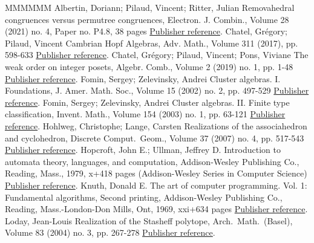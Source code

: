 \documentclass[11pt]{article}
\theoremstyle{definition}
\numberwithin{equation}{section}
\begin{document}
\begin{thebibliography}{MMMMMM}
 Albertin, Doriann; Pilaud, Vincent; Ritter, Julian Removahedral congruences versus permutree congruences, Electron. J. Combin., Volume 28 (2021) no. 4, Paper no. P4.8, 38 pages \href{https://alco.centre-mersenne.org/articles/10.5802/alco.249/#AlbertinPilaudRitter-Removahedra}{Publisher reference}.
 Chatel, Grégory; Pilaud, Vincent Cambrian Hopf Algebras, Adv. Math., Volume 311 (2017), pp. 598-633 \href{https://alco.centre-mersenne.org/articles/10.5802/alco.249/#ChatelPilaud}{Publisher reference}.
 Chatel, Grégory; Pilaud, Vincent; Pons, Viviane The weak order on integer posets, Algebr. Comb., Volume 2 (2019) no. 1, pp. 1-48 \href{https://alco.centre-mersenne.org/articles/10.5802/alco.249/#ChatelPilaudPons}{Publisher reference}.
 Fomin, Sergey; Zelevinsky, Andrei Cluster algebras. I. Foundations, J. Amer. Math. Soc., Volume 15 (2002) no. 2, pp. 497-529 \href{https://alco.centre-mersenne.org/articles/10.5802/alco.249/#FominZelevinsky-ClusterAlgebrasI}{Publisher reference}.
 Fomin, Sergey; Zelevinsky, Andrei Cluster algebras. II. Finite type classification, Invent. Math., Volume 154 (2003) no. 1, pp. 63-121 \href{https://alco.centre-mersenne.org/articles/10.5802/alco.249/#FominZelevinsky-ClusterAlgebrasII}{Publisher reference}.
 Hohlweg, Christophe; Lange, Carsten Realizations of the associahedron and cyclohedron, Discrete Comput. Geom., Volume 37 (2007) no. 4, pp. 517-543 \href{https://alco.centre-mersenne.org/articles/10.5802/alco.249/#HohlwegLange}{Publisher reference}.
 Hopcroft, John E.; Ullman, Jeffrey D. Introduction to automata theory, languages, and computation, Addison-Wesley Publishing Co., Reading, Mass., 1979, x+418 pages (Addison-Wesley Series in Computer Science) \href{https://alco.centre-mersenne.org/articles/10.5802/alco.249/#HopcroftUllman}{Publisher reference}.
 Knuth, Donald E. The art of computer programming. Vol. 1: Fundamental algorithms, Second printing, Addison-Wesley Publishing Co., Reading, Mass.-London-Don Mills, Ont, 1969, xxi+634 pages \href{https://alco.centre-mersenne.org/articles/10.5802/alco.249/#Knuth-TAOCP1}{Publisher reference}.
 Loday, Jean-Louis Realization of the Stasheff polytope, Arch. Math. (Basel), Volume 83 (2004) no. 3, pp. 267-278 \href{https://alco.centre-mersenne.org/articles/10.5802/alco.249/#Loday}{Publisher reference}.

\end{thebibliography}
\end{document}
